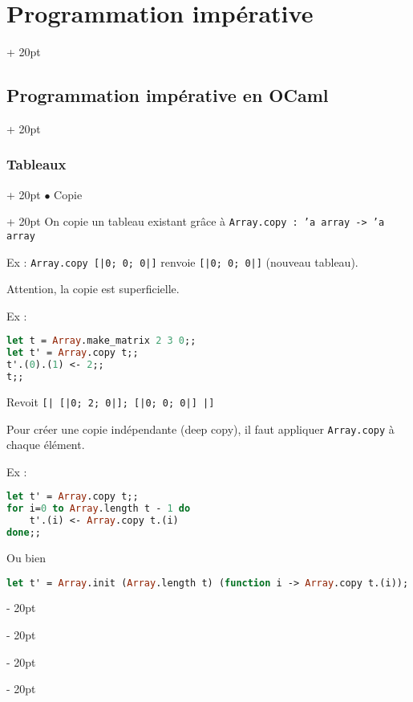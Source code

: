 \documentclass[a4paper, 12pt, twoside]{article}
\newcommand{\ind}[1][20pt]{\advance\leftskip + #1}
\newcommand{\deind}[1][20pt]{\advance\leftskip - #1}
\newenvironment{indentedenv}[1][20pt]{\par \ind[#1]}{\par \deind}
\newenvironment{indt}[2][20pt]{#2 \begin{indentedenv}[#1]}{\end{indentedenv}} %
\begin{document}
\begin{indt}{\section{Programmation impérative}}
\begin{indt}{\subsection{Programmation impérative en OCaml}}
\begin{indt}{\subsubsection{Tableaux}}
                \begin{indt}{$\bullet$ Copie}
                    On copie un tableau existant grâce à \texttt{Array.copy : 'a array -> 'a array}
                    
                    Ex : \texttt{Array.copy [|0; 0; 0|]} renvoie \texttt{[|0; 0; 0|]} (nouveau tableau).
                    
                    Attention, la copie est superficielle.
                    
                    Ex :
                
                    \vspace{6pt}
                    
                    \begin{lstlisting}[language=Caml, xleftmargin=100pt]
let t = Array.make_matrix 2 3 0;;
let t' = Array.copy t;;
t'.(0).(1) <- 2;;
t;;\end{lstlisting}
                    
                    Revoit \texttt{[| [|0; 2; 0|]; [|0; 0; 0|] |]}
                    
                    Pour créer une copie indépendante (deep copy), il faut appliquer \texttt{Array.copy} à chaque élément.
                    
                    Ex :
                
                    \vspace{6pt}
                    
                    \begin{lstlisting}[language=Caml, xleftmargin=100pt]
let t' = Array.copy t;;
for i=0 to Array.length t - 1 do
    t'.(i) <- Array.copy t.(i)
done;;\end{lstlisting}
                    
                    Ou bien
                
                    \vspace{6pt}
                    
                    \begin{lstlisting}[language=Caml, xleftmargin=100pt]
let t' = Array.init (Array.length t) (function i -> Array.copy t.(i));\end{lstlisting}
                \end{indt}
                
                \vspace{12pt}
                

\end{indt}
\end{indt}
\end{indt}
\end{document}
